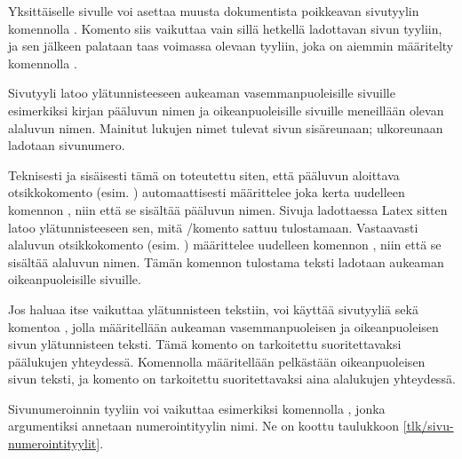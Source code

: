 Yksittäiselle sivulle voi asettaa muusta dokumentista poikkeavan
sivutyylin komennolla . Komento siis vaikuttaa
vain sillä hetkellä ladottavan sivun tyyliin, ja sen jälkeen palataan
taas voimassa olevaan tyyliin, joka on aiemmin määritelty komennolla
.

\begin{koodilohkosis}
\thispagestyle{empty}
\end{koodilohkosis}

\noindent
Sivutyyli  latoo ylätunnisteeseen aukeaman
vasemmanpuoleisille sivuille esimerkiksi kirjan pääluvun nimen ja
oikeanpuoleisille sivuille meneillään olevan alaluvun nimen. Mainitut
lukujen nimet tulevat sivun sisäreunaan; ulkoreunaan ladotaan
sivunumero.

Teknisesti ja sisäisesti tämä on toteutettu siten, että pääluvun
aloittava otsikkokomento (esim. ) automaattisesti
määrittelee joka kerta uudelleen komennon , niin että
se sisältää pääluvun nimen. Sivuja ladottaessa Latex sitten latoo
ylätunnisteeseen sen, mitä \-/komento sattuu
tulostamaan. Vastaavasti alaluvun otsikkokomento (esim.
) määrittelee uudelleen komennon ,
niin että se sisältää alaluvun nimen. Tämän komennon tulostama teksti
ladotaan aukeaman oikeanpuoleisille sivuille.

Jos haluaa itse vaikuttaa ylätunnisteen tekstiin, voi käyttää sivutyyliä
 sekä komentoa , jolla määritellään
aukeaman vasemmanpuoleisen ja oikeanpuoleisen sivun ylätunnisteen
teksti. Tämä komento on tarkoitettu suoritettavaksi päälukujen
yhteydessä. Komennolla  määritellään pelkästään
oikeanpuoleisen sivun teksti, ja komento on tarkoitettu suoritettavaksi
aina alalukujen yhteydessä.

\begin{koodilohkosis}
{}        %
\end{koodilohkosis}

\noindent
Sivunumeroinnin tyyliin voi vaikuttaa esimerkiksi komennolla
, jonka argumentiksi annetaan numerointityylin
nimi. Ne on koottu taulukkoon \ref{tlk/sivu-numerointityylit}.

\begin{koodilohkosis}
\end{koodilohkosis}

